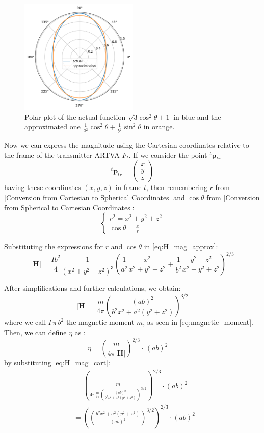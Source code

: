 \begin{figure}[h!]
\centering
\includegraphics[width=0.5\textwidth]{images/polar_plot.png}
\caption{Polar plot of the actual function $\sqrt{ 3 \cos^2 \theta + 1} $ in blue 
and the approximated one $\frac{1}{a^2 }\cos^2 \theta + \frac{1}{b^2} \sin^2 \theta$ in orange.}
\label{fig:polarplot}
\end{figure}

Now we can express the magnitude using the Cartesian coordinates relative to the frame of the transmitter ARTVA $F_t$. 
If we consider the point ${}^t \mathbf{p}_{tr}$\[
    {}^t \mathbf{p}_{tr} = \begin{pmatrix}
    x \\
    y \\
    z
\end{pmatrix}
\] having these coordinates $(x,y,z)$ in frame $t$, then remembering $r$ from \ref{Conversion from Cartesian to Spherical Coordinates} and $\cos\theta$ from \ref{Conversion from Spherical to Cartesian Coordinates}:
\[
\begin{cases}
r^2 = x^2 + y^2 + z^2 \\
\cos\theta = \frac{x}{r}
\end{cases}
\]

Substituting the expressions for \(r\) and \(\cos\theta\) in \ref{eq:H_mag_approx}:
\[
\left| \mathbf{H} \right| = \frac{I b^2}{4} \frac{1}{(x^2 + y^2 + z^2)^{3}} \left(\frac{1}{a^2} \frac{x^2}{x^2 + y^2 + z^2} + \frac{1}{b^2} \frac{y^2 + z^2}{x^2 + y^2 + z^2}\right)^{2/3}
\]

After simplifications and further calculations, we obtain:
\begin{equation}
    \left| \mathbf{H} \right| = \frac{m}{4 \pi} \left(\frac{(ab)^2}{b^2 x^2 + a^2 (y^2 + z^2)}\right)^{3/2}
    \label{eq:H_mag_cart}
\end{equation}
where we call $I \, \pi \, b^2$ the magnetic moment $m$, as seen in \ref{eq:magnetic_moment}.
Then, we can define $\eta$ as \cite{main}:
\[ \eta = \left( \frac{m}{4 \pi \left| \mathbf{H} \right|} \right)^{2/3} \cdot \, (ab)^2 = \]
by substituting \ref{eq:H_mag_cart}:
\[
\begin{aligned}
&= \left( \frac{m}{4 \pi \frac{m}{4 \pi} \left(\frac{(ab)^2}{b^2 x^2 + a^2 (y^2 + z^2)}\right)^{3/2}} \right)^{2/3} \cdot (ab)^2 = 
\\
&= \left( \left(\frac{b^2 x^2 + a^2 (y^2 + z^2)}{(ab)^2}\right)^{3/2}\right)^{2/3} \cdot (ab)^2
\end{aligned}
\]


